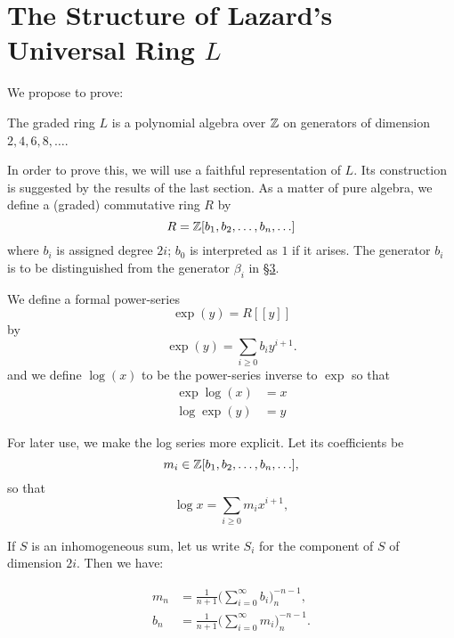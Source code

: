 \documentclass[../main]{subfiles}
\begin{document}
\label{sec:p2c7}

\chapter{The Structure of Lazard's Universal Ring $L$}
We propose to prove: 

\begin{theorem}
\label{thm:p2c07.1}
The graded ring $L$ is a polynomial algebra over $\mathbb{Z}$ on generators of dimension $2, 4, 6, 8, \ldots$.
\end{theorem}

In order to prove this, we will use a faithful representation of $L$. Its construction is suggested by the results of the last section. As a matter of pure algebra, we define a (graded) commutative ring $R$ by \[R = \mathbb{Z}[b_1, b_2, \ldots, b_n, \ldots]\] where $b_i$ is assigned degree $2i$; $b_0$ is interpreted as $1$ if it arises. The generator $b_i$ is to be distinguished from the generator $\beta_i$ in \hyperref[sec:p2c3]{\S 3}.

We define a formal power-series \[\exp(y) = R[[y]]\] by 
\begin{equation}
\tag{7.2} 
\label{eqn:p2c07.2}
\exp(y) = \sum_{i \ge 0} b_i y^{i + 1}.
\end{equation}
and we define $\log(x)$ to be the power-series inverse to $\exp$ so that
\begin{equation}
\tag{7.3}
\label{eqn:p2c07.3}
\begin{split}
\exp \log(x) & = x \\
\log \exp(y) & = y
\end{split}
\end{equation}

For later use, we make the log series more explicit. Let its coefficients be \[m_i \in \mathbb{Z} [b_1, b_2, \ldots, b_n, \ldots],\] so that 
\begin{equation}
\tag{7.4}
\label{eqn:p2c07.4}
\log x = \sum_{i \ge 0} m_i x^{i + 1},
\end{equation}

If $S$ is an inhomogeneous sum, let us write $S_i$ for the component of $S$ of dimension $2i$. Then we have: 

\begin{customprop}{7.5}
\label{prop:p2c07.5}
\begin{align*}m_n & = \frac 1 {n + 1} \bigg(\sum_{i = 0}^\infty b_i\bigg)_n^{-n-1}, \\ b_n & = \frac 1 {n + 1} \bigg(\sum_{i = 0}^\infty m_i\bigg)_n^{-n-1}.\end{align*}
\end{customprop}
\end{document}
